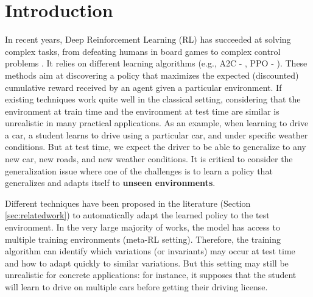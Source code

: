 \section{Introduction}
\label{Introduction}

In recent years, Deep Reinforcement Learning (RL) has succeeded at solving complex tasks, from defeating humans in board games \citep{AlphaZero} to complex control problems \citep{sim2real, ppo}. It relies on different learning algorithms (e.g., A2C - \citep{A2C}, PPO - \citep{ppo}). These methods aim at discovering a policy that maximizes the expected (discounted) cumulative reward received by an agent given a particular environment. %
If existing techniques work quite well in the classical setting, considering that the environment at train time and the environment at test time are similar is unrealistic in many practical applications. As an example, when learning to drive a car, a student  learns to drive using a particular car, and under specific weather conditions. But at test time, we expect the driver to be able to generalize to any new car, new roads, and new weather conditions. It is critical to consider the generalization issue where one of the challenges is to learn a policy that generalizes and adapts itself to \textbf{unseen environments}.

Different techniques have been proposed in the literature (Section \ref{sec:relatedwork}) to automatically adapt the learned policy to the test environment. In the very large majority of works, the model has access to multiple training environments (meta-RL setting). Therefore, the training algorithm can identify which variations (or invariants) may occur at test time and how to adapt quickly to similar variations. But this setting may still be unrealistic for concrete applications: for instance, it supposes that the student will learn to drive on multiple cars before getting their driving license. 

